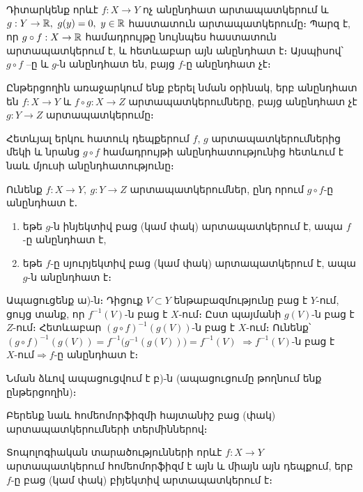 \documentclass[./main.tex]{subfiles}
\begin{document}
\begin{example}\label{ch9ex5} 
Դիտարկենք որևէ $f:X\rightarrow Y$ ոչ անընդհատ արտապատկերում և ${g:Y\rightarrow \mathbb{R}},\ g(y)=0,\ y\in\mathbb{R}$ հաստատուն արտապատկերումը։ Պարզ է, որ ${g\circ f:X\rightarrow\mathbb{R}}$ համադրույթը նույնպես հաստատուն արտապատկերում է, և հետևա\-բար այն անընդհատ է։ Այսպիսով՝ $g\circ f$ –ը և $g$-ն անընդհատ են, բայց $f$-ը անընդհատ չէ։
\end{example}

\par Ընթերցողին առաջարկում ենք բերել նման օրինակ, երբ անընդհատ են $f:X\rightarrow Y$ և $f\circ g:X\rightarrow Z$ արտապատկերումները, բայց անընդհատ չէ $g:Y\rightarrow Z$ արտապատկերումը։
\par Հետևյալ երկու հատուկ դեպքերում $f$, $g$ արտապատկերումներից մեկի և նրանց $g\circ f$ համադրույթի անընդհատությունից հետևում է նաև մյուսի անընդհատությունը։

\begin{theorem}\label{ch9thm9}
Ունենք $f:X\rightarrow Y,\ g:Y\rightarrow Z$ արտապատկերումներ, ընդ որում $g\circ f$-ը անընդհատ է․
\begin{enumerate}
    \item [ա)] եթե $g$-ն ինյեկտիվ բաց (կամ փակ) արտապատկերում է, ապա $f$-ը անընդհատ է,
    \item [բ)] եթե $f$-ը սյուրյեկտիվ բաց (կամ փակ) արտապատկերում է, ապա $g$-ն անընդ\-հատ է։
\end{enumerate}
\end{theorem}

\begin{varproof}
Ապացուցենք ա)-ն։ Դիցուք $V\subset Y$ ենթաբազմությունը բաց է $Y$-ում, ցույց \linebreak տանք, որ $f^{-1}(V)$-ն բաց է $X$-ում։ Ըստ պայմանի $g(V)$-ն բաց է $Z$-ում։ Հետևաբար $(g\circ f)^{-1}(g(V))$-ն բաց է $X$-ում։ Ունենք՝ $(g\circ f)^{-1}(g(V))=f^{-1}\big(g^{-1}(g(V))\big)=f^{-1} (V)$ $\Rightarrow f^{-1} (V)$-ն բաց է $X\textrm{-ում} \Rightarrow f$-ը անընդհատ է։
\end{varproof}

\par Նման ձևով ապացուցվում է բ)-ն (ապացուցումը թողնում ենք ընթերցողին)։ 
\par Բերենք նաև հոմեոմորֆիզմի հայտանիշ բաց (փակ) արտապատկերումների տերմիններով։

\begin{theorem}\label{ch9thm10} 
Տոպոլոգիական տարածությունների որևէ $f:X\rightarrow Y$ արտապատ\-կե\-րում հոմեոմորֆիզմ է այն և միայն այն դեպքում, երբ $f$-ը բաց (կամ փակ) բիյեկտիվ արտապատկերում է։
\end{theorem}
\end{document}

